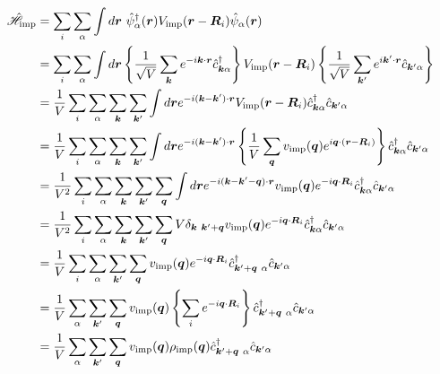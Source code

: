 \documentclass[dvipdfmx, 11pt, a4paper]{jsarticle}
\theoremstyle{definition}
\numberwithin{equation}{section}
\begin{document}
    \begin{derivationBox}
        \begin{align}
            \hat{\mathscr{H}}_{\text{imp}} &= \sum_{i}\sum_{\alpha} \int d\bm{r}\ \hat{\psi}^\dagger_\alpha (\bm{r})V_{\text{imp}}(\bm{r}-\bm{R}_i) \hat{\psi}_{\alpha}(\bm{r}) \notag \\
            &= \sum_i \sum_{\alpha} \int d\bm{r} \left\{ \frac{1}{\sqrt{V}} \sum_{\bm{k}} e^{-i\bm{k}\cdot\bm{r}} \hat{c}^\dagger_{\bm{k}\alpha}  \right\} V_{\text{imp}}(\bm{r}-\bm{R}_i)\left\{ \frac{1}{\sqrt{V}} \sum_{\bm{k}'} e^{i\bm{k}'\cdot\bm{r}} \hat{c}_{\bm{k}'\alpha}\right\}  \notag \\
            &= \frac{1}{V}\sum_i \sum_{\alpha} \sum_{\bm{k}}\sum_{\bm{k}'}\int d\bm{r}  e^{-i(\bm{k}-\bm{k}')\cdot\bm{r}}   V_{\text{imp}}(\bm{r}-\bm{R}_i) \hat{c}^\dagger_{\bm{k}\alpha} \hat{c}_{\bm{k}'\alpha} \notag \\
            &= \frac{1}{V}\sum_i \sum_{\alpha} \sum_{\bm{k}}\sum_{\bm{k}'}\int d\bm{r}  e^{-i(\bm{k}-\bm{k}')\cdot\bm{r}}   \left\{ \frac{1}{V} \sum_{\bm{q}} v_{\text{imp}}(\bm{q}) e^{i\bm{q}\cdot(\bm{r}-\bm{R}_i)} \right\} \hat{c}^\dagger_{\bm{k}\alpha} \hat{c}_{\bm{k}'\alpha} \notag \\
            &= \frac{1}{V^2}\sum_i \sum_{\alpha} \sum_{\bm{k}}\sum_{\bm{k}'}\sum_{\bm{q}}\int d\bm{r}  e^{-i(\bm{k}-\bm{k}'-\bm{q})\cdot\bm{r}}      v_{\text{imp}}(\bm{q}) e^{-i\bm{q}\cdot\bm{R}_i}  \hat{c}^\dagger_{\bm{k}\alpha} \hat{c}_{\bm{k}'\alpha} \notag \\
            &= \frac{1}{V^2}\sum_i \sum_{\alpha} \sum_{\bm{k}}\sum_{\bm{k}'}\sum_{\bm{q}} V\delta_{\bm{k}\ \bm{k}'+\bm{q}}      v_{\text{imp}}(\bm{q}) e^{-i\bm{q}\cdot\bm{R}_i}  \hat{c}^\dagger_{\bm{k}\alpha} \hat{c}_{\bm{k}'\alpha} \notag \\
            &= \frac{1}{V}\sum_i \sum_{\alpha} \sum_{\bm{k}'}\sum_{\bm{q}}      v_{\text{imp}}(\bm{q}) e^{-i\bm{q}\cdot\bm{R}_i}  \hat{c}^\dagger_{\bm{k}'+\bm{q}\ \alpha} \hat{c}_{\bm{k}'\alpha} \notag \\
            &= \frac{1}{V} \sum_{\alpha} \sum_{\bm{k}'}\sum_{\bm{q}}      v_{\text{imp}}(\bm{q}) \left\{ \sum_ie^{-i\bm{q}\cdot\bm{R}_i}  \right\}\hat{c}^\dagger_{\bm{k}'+\bm{q}\ \alpha} \hat{c}_{\bm{k}'\alpha} \notag \\
            &= \frac{1}{V} \sum_{\alpha} \sum_{\bm{k}'}\sum_{\bm{q}}      v_{\text{imp}}(\bm{q}) \rho_{\text{imp}}(\bm{q})\hat{c}^\dagger_{\bm{k}'+\bm{q}\ \alpha} \hat{c}_{\bm{k}'\alpha} \notag \\

\end{align}
\end{derivationBox}
\end{document}
